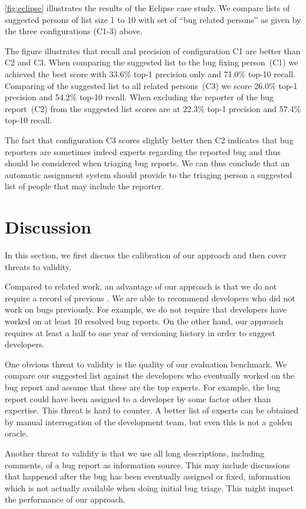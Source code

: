 \autoref{fig:eclipse} illustrates the results of the Eclipse case study. We compare lists of suggested persons of list size 1 to 10 with set of ``bug related persons'' as given by the three configurations (C1-3) above.

The figure illustrates that recall and precision of configuration C1 are better than C2 and C3. When comparing the suggested list to the bug fixing person~(C1) we achieved the best score with 33.6\% top-1 precision only and 71.0\% top-10 recall. Comparing of the suggested list to all related persons~(C3) we score 26.0\% top-1 precision and 54.2\% top-10 recall. When excluding the reporter of the bug report~(C2) from the suggested list scores are at 22.3\% top-1 precision and 57.4\% top-10 recall.

The fact that configuration C3 scores slightly better then C2 indicates that bug reporters are sometimes indeed experts regarding the reported bug and thus should be considered when triaging bug reports. We can thus conclude that an automatic assignment system should provide to the triaging person a suggested list of people that may include the reporter.

\section{Discussion}\label{sec:discussion}

In this section, we first discuss the calibration of our approach and then cover threats to validity.

Compared to related work, an advantage of our approach is that we do not require a record of previous \BRs. We are able to recommend developers who did not work on bugs previously. For example, we do not require that developers have worked on at least 10 resolved bug reports. On the other hand, our approach requires at least a half to one year of versioning history in order to suggest developers. 

One obvious threat to validity is the quality of our evaluation benchmark. We compare our suggested list against the developers who eventually worked on the bug report and assume that these are the top experts. For example, the bug report could have been assigned to a developer by some factor other than expertise. This threat is hard to counter. A better list of experts can be obtained by manual interrogation of the development team, but even this is not a golden oracle.

Another threat to validity is that we use all long descriptions, including comments, of a bug report as information source. This may include discussions that happened after the bug has been eventually assigned or fixed, information which is not actually available when doing initial bug triage. This might impact the performance of our approach. 


